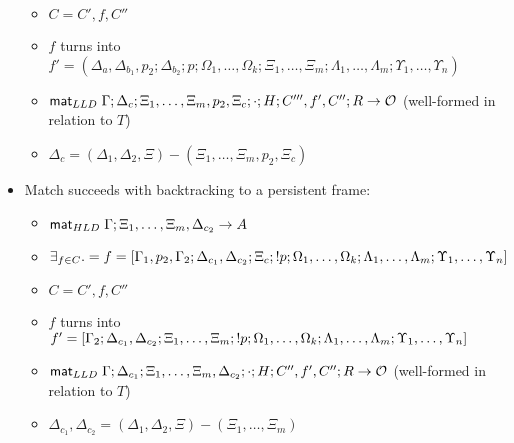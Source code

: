 \begin{lemma}
\begin{itemize}[leftmargin=*]
\begin{itemize}[leftmargin=\secondm]
      \item $C = C', f, C''$

      \item $f$ turns into $f' = (\Delta_a, \Delta_{b_1}, p_2;
            \Delta_{b_2}; p; \Omega_1, \dotsc, \Omega_k; \Xi_1, \dotsc, \Xi_m;
            \Lambda_1, \dotsc, \Lambda_m; \Upsilon_1, \dotsc, \Upsilon_n)$

      \item $\mathsf{mat}_{LLD} \; \Gamma; \Delta_c; \Xi_1, \dotsc, \Xi_m, p_2, \Xi_c; \cdot; H;
            C''', f', C''; R \rightarrow \mathcal{O}$ (well-formed in
                  relation to $T$)
      \item $\Delta_c = (\Delta_1, \Delta_2, \Xi) - (\Xi_1, \dotsc, \Xi_m, p_2, \Xi_c)$
   \end{itemize}

   \item Match succeeds with backtracking to a persistent frame:
   \begin{itemize}[leftmargin=\secondm]
      \item $\mathsf{mat}_{HLD} \; \Gamma; \Xi_1, \dotsc, \Xi_m, \Delta_{c_2} \rightarrow A$
      \item $\exists_{f \in C}. = f = [\Gamma_1, p_2, \Gamma_2; \Delta_{c_1}, \Delta_{c_2}; \Xi_c; {!}
         p; \Omega_1, \dotsc, \Omega_k; \Lambda_1, \dotsc, \Lambda_m;
         \Upsilon_1, \dotsc, \Upsilon_n]$
      \item $C = C', f, C''$
      \item $f$ turns into $f' = [\Gamma_2; \Delta_{c_1}, \Delta_{c_2}; \Xi_1, \dotsc,
         \Xi_m; {!} p; \Omega_1, \dotsc, \Omega_k; \Lambda_1, \dotsc,
         \Lambda_m; \Upsilon_1, \dotsc, \Upsilon_n]$
      \item $\mathsf{mat}_{LLD} \; \Gamma; \Delta_{c_1}; \Xi_1, \dotsc, \Xi_m, \Delta_{c_2};
         \cdot; H; C'', f', C''; R \rightarrow \mathcal{O}$ (well-formed in
            relation to $T$)
      \item $\Delta_{c_1}, \Delta_{c_2} = (\Delta_1, \Delta_2,
            \Xi) - (\Xi_1, \dotsc, \Xi_m)$
   \end{itemize}
\end{itemize}
\end{lemma}

